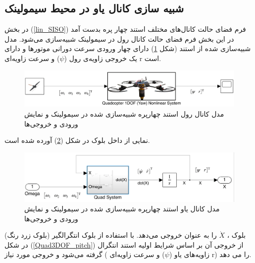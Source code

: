 \subsection{شبیه سازی کانال یاو در محیط سیمولینک}
در بخش
(\ref{lin_SISO})
فرم فضای حالت کانال‌های مختلف استند چهار پره بدست آمد در این بخش فرم فضای حالت کانال رول در سیمولینک شبیه‌سازی می‌شود.
مدل شبیه‌سازی شده از استند (شکل \ref{yaw_simulink}) دارای چهار ورودی سرعت دورانی موتورها  و دارای یک خروجی زاویه‌ی رول ($\psi$) و  سرعت زاویه‌ای r است.
\begin{figure}[H]
	\includegraphics[width=16cm]{../../Figures/QuadSimulation/yaw_Stand_Model.png}
	\centering
	\vspace*{-15mm}
	\caption{مدل کانال رول استند چهارپره شبیه‌سازی شده در سیمولینک و نمایش ورودی و خروجی‌ها}
	\label{yaw_simulink}
\end{figure}

نمایی از داخل بلوک
در شکل (\ref{Quad1DOF_yaw}) آورده شده است.
\begin{figure}[H]
	\includegraphics[width=16cm]{../../Figures/QuadSimulation/yaw_Integrator.png}
	\centering
	\vspace*{-15mm}
	\caption{مدل کانال یاو استند چهارپره شبیه‌سازی شده در سیمولینک و نمایش ورودی و خروجی‌ها}
	\label{Quad1DOF_yaw}
\end{figure}
بلوک
،
$\dot X$ را به عنوان خروجی می‌دهد. با استفاده از بلوک انتگرالگیر (بلوک زرد رنگ) در شکل
(\ref{Quad3DOF_pitch})
از خروجی آن بر اساس شرایط اولیه استند انتگرال گرفته می‌شود و خروجی مورد نیاز ( زاویه‌های یاو ($\psi$) و سرعت زاویه‌ای‌
r)
را می دهد.

